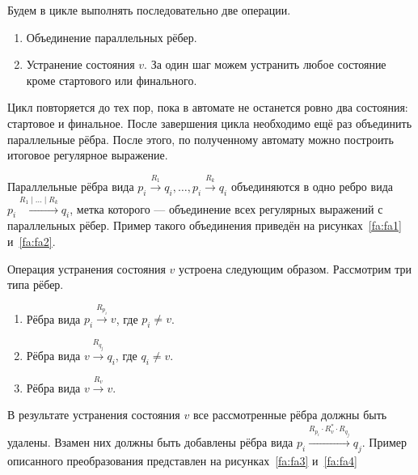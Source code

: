 Будем в цикле выполнять последовательно две операции.
\begin{enumerate}
    \item Объединение параллельных рёбер.
    \item Устранение состояния $v$. За один шаг можем устранить любое состояние кроме стартового или финального.
\end{enumerate}
Цикл повторяется до тех пор, пока в автомате не останется ровно два состояния: стартовое и финальное.
После завершения цикла необходимо ещё раз объединить параллельные рёбра. 
После этого, по полученному автомату можно построить итоговое регулярное выражение.

Параллельные рёбра вида $p_i \xrightarrow{R_1} q_i, \ldots, p_i \xrightarrow{R_k} q_i$ объединяются в одно ребро вида $p_i \xrightarrow{R_1 \mid \ldots \mid R_k} q_i$, метка которого --- объединение всех регулярных выражений с параллельных рёбер.
Пример такого объединения приведён на рисунках~\ref{fa:fa1} и~\ref{fa:fa2}.

Операция устранения состояния $v$ устроена следующим образом. 
Рассмотрим три типа рёбер.
\begin{enumerate}
    \item Рёбра вида $p_i \xrightarrow{R_{p_i}} v$, где $p_i \neq v$.
    \item Рёбра вида $v \xrightarrow{R_{q_j}} q_i$, где $q_i \neq v$.
    \item Рёбра вида $v \xrightarrow{R_v} v$.
\end{enumerate}

В результате устранения состояния $v$ все рассмотренные рёбра должны быть удалены. 
Взамен них должны быть добавлены рёбра вида $p_i \xrightarrow{R_{p_i} \cdot R_v^* \cdot R_{q_j}} q_j$.
Пример описанного преобразования представлен на рисунках~\ref{fa:fa3} и~\ref{fa:fa4} 

